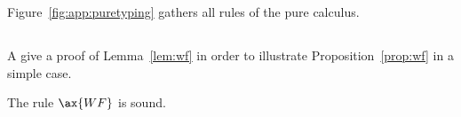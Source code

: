 \noindent
Figure~\ref{fig:app:puretyping} gathers all rules of the pure calculus.

\subsection{}
\label{sec:app:wf}

A give a proof of Lemma~\ref{lem:wf} 
in order to illustrate Proposition~\ref{prop:wf} in a simple case.



\begin{lemma}
\label{lem:app:wf}
The rule $\ax{WF}$ is sound.
\end{lemma}

